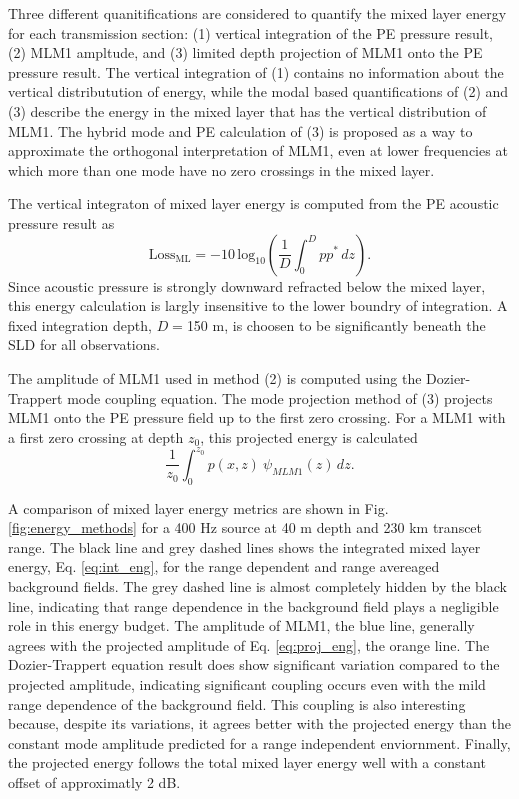 \documentclass[preprint,NumberedRefs]{JASA}
\begin{document}
Three different quanitifications are considered to quantify the mixed layer energy for each transmission section: (1) vertical integration of the PE pressure result, (2) MLM1 ampltude, and (3) limited depth projection of MLM1 onto the PE pressure result. The vertical integration of (1) contains no information about the vertical distributution of energy, while the modal based quantifications of (2) and (3) describe the energy in the mixed layer that has the vertical distribution of MLM1. The hybrid mode and PE calculation of (3) is proposed as a way to approximate the orthogonal interpretation of MLM1, even at lower frequencies at which more than one mode have no zero crossings in the mixed layer.

The vertical integraton of mixed layer energy is computed from the PE acoustic pressure result as
\begin{equation}
    \textrm{Loss}_{\textrm{ML}} = -10 \, \textrm{log}_{10} \left( \frac{1}{D} \int^{D}_0 p p^* \,  dz \right).
    \label{eq:int_eng}
\end{equation}
Since acoustic pressure is strongly downward refracted below the mixed layer, this energy calculation is largly insensitive to the lower boundry of integration. A fixed integration depth, $D=$150 m, is choosen to be significantly beneath the SLD for all observations.

The amplitude of MLM1 used in method (2) is computed using the Dozier-Trappert mode coupling equation. The mode projection method of (3) projects MLM1 onto the PE pressure field up to the first zero crossing. For a MLM1 with a first zero crossing at depth $z_0$, this projected energy is calculated
\begin{equation}
    \frac{1}{z_0} \int^{z_0}_0 p(x, z) \ \psi_{MLM1}(z) \,  dz.
    \label{eq:proj_eng}
\end{equation}

A comparison of mixed layer energy metrics are shown in Fig. \ref{fig:energy_methods} for a 400 Hz source at 40 m depth and 230 km transcet range. The black line and grey dashed lines shows the integrated mixed layer energy, Eq. \eqref{eq:int_eng}, for the range dependent and range avereaged background fields. The grey dashed line is almost completely hidden by the black line, indicating that range dependence in the background field plays a negligible role in this energy budget. The amplitude of MLM1, the blue line, generally agrees with the projected amplitude of Eq. \eqref{eq:proj_eng}, the orange line. The Dozier-Trappert equation result does show significant variation compared to the projected amplitude, indicating significant coupling occurs even with the mild range dependence of the background field. This coupling is also interesting because, despite its variations, it agrees better with the projected energy than the constant mode amplitude predicted for a range independent enviornment. Finally, the projected energy follows the total mixed layer energy well with a constant offset of approximatly 2 dB.
\end{document}
